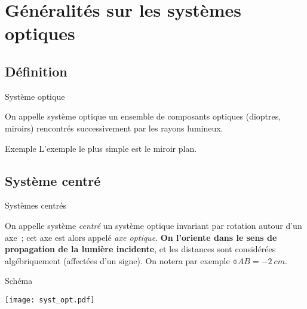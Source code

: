 \documentclass[../main/main.tex]{subfiles}
\begin{document}
\section{Généralités sur les systèmes optiques}
\subsection{Définition}

\begin{tcbraster}[raster columns=2, raster equal height=rows]
    
    \begin{defi}[label=def:so]{Système optique}
    
        On appelle système optique un ensemble de composants optiques (dioptres,
        miroirs) rencontrés successivement par les rayons lumineux.
    
    \end{defi}
    \begin{NCexem}[]{Exemple}
        L'exemple le plus simple est le miroir plan.
    \end{NCexem}
\end{tcbraster}

\subsection{Système centré}
\begin{tcbraster}[raster columns=2, raster equal height=rows]
    \begin{defi}[label=def:vocso]{Systèmes centrés}

        On appelle système \textit{centré} un système optique invariant par
        rotation autour d'un axe~; cet axe est alors appelé \textit{axe
        optique}. \textbf{On l'oriente dans le sens de propagation de la lumière
        incidente}, et les distances sont considérées algébriquement (affectées
        d'un signe). On notera par exemple $\obar{AB} = \SI{-2}{cm}$.

    \end{defi}
    \begin{NCexem}[width=\linewidth]{Schéma}
        \begin{center}
            \texttt{[image: syst\_opt.pdf]}
            \label{fig:socent}
        \end{center}
    \end{NCexem}
\end{tcbraster}
\end{document}
